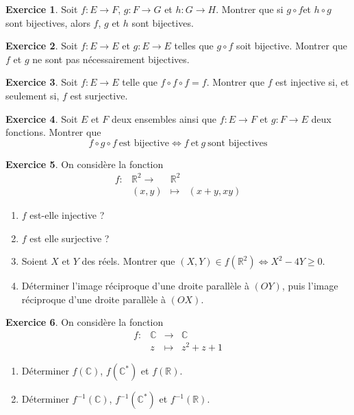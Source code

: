 \documentclass[french]{book}
\newcommand{\R}{\mathbb{R}}
\newcommand{\C}{\mathbb{C}}
\newcommand{\st}{^*}
\newcommand{\inv}{^{-1}}
\theoremstyle{definition}
\newtheorem{ex}{Exercice}[chapter]
\theoremstyle{theorem}
\theoremstyle{remark}
\begin{document}
\begin{ex}
	Soit $f:E\to F$, $g:F\to G$ et $h:G\to H$. Montrer que si $g\circ f$et $h\circ g$ sont bijectives, alors $f$, $g$ et $h$ sont bijectives.
\end{ex}

\begin{ex}
	Soit $f:E\to E$ et $g:E\to E$ telles que $g\circ f$ soit bijective. Montrer que $f$ et $g$ ne sont pas nécessairement bijectives.
\end{ex}

\begin{ex}
	Soit $f:E\to E$ telle que $f\circ f\circ f=f$. Montrer que $f$ est injective si, et seulement si, $f$ est surjective.
\end{ex}

\begin{ex}
	Soit $E$ et $F$ deux ensembles ainsi que $f: E \longrightarrow F$ et $g: F \longrightarrow E$ deux fonctions. Montrer que $$f \circ g \circ f  \ \text{est bijective} \Longleftrightarrow f \ \text{et} \ g \ \text{sont bijectives}$$
\end{ex}

\begin{ex}
	On considère la fonction $$\begin{array}{lrcl}
		f:&\R^2\longrightarrow&\R^2\\
		&(x,y)&\longmapsto&(x+y,xy)
	\end{array}$$
	\begin{enumerate}
		\item $f$ est-elle injective ?
		\item $f$ est elle surjective ?
		\item Soient $X$ et $Y$ des réels. Montrer que $(X,Y)\in f(\R^2)\iff X^2-4Y\geqslant 0$.
		\item Déterminer l'image réciproque d'une droite parallèle à $(OY)$, puis l'image réciproque d'une droite parallèle à $(OX)$.
	\end{enumerate}
\end{ex}

\begin{ex}
	On considère la fonction $$\begin{array}{lrcl}
		f:&\C&\longrightarrow&\C\\
		&z&\longmapsto&z^2+z+1
	\end{array}$$
	\begin{enumerate}
		\item Déterminer $f(\C)$, $f(\C\st)$ et $f(\R)$.
		\item Déterminer $f\inv(\C)$, $f\inv(\C\st)$ et $f\inv(\R)$.
	\end{enumerate}
\end{ex}
\end{document}
